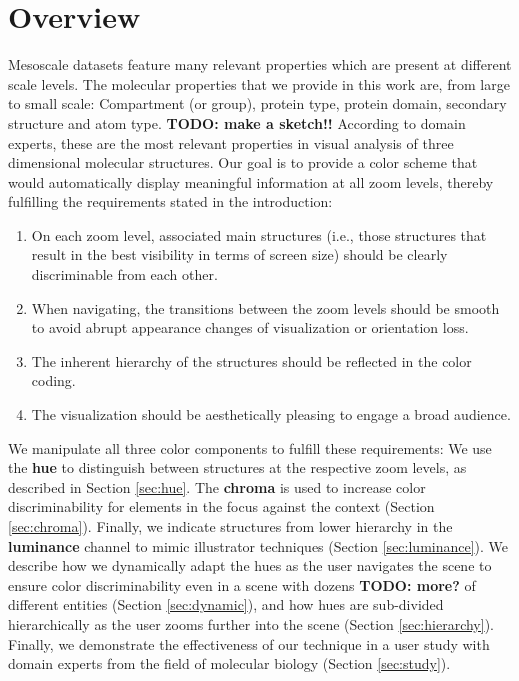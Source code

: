 \documentclass[review,journal]{vgtc}         %
\begin{document}
	\section{Overview}
	\label{Overview}

	
	Mesoscale datasets feature many relevant properties which are present at different scale levels.
	The molecular properties that we provide in this work are, from large to small scale: Compartment (or group), protein type, protein domain, secondary structure and atom type. \textbf{TODO: make a sketch!!}
	According to domain experts, these are the most relevant properties in visual analysis of three dimensional molecular structures.
	Our goal is to provide a color scheme that would automatically display meaningful information at all zoom levels, thereby fulfilling the requirements stated in the introduction: 
	

\begin{enumerate}
	\item On each zoom level, associated main structures (i.e., those structures that result in the best visibility in terms of screen size) should be clearly discriminable from each other. 
	\item When navigating, the transitions between the zoom levels should be smooth to avoid abrupt appearance changes of visualization or orientation loss. 
	\item The inherent hierarchy of the structures should be reflected in the color coding. 
	\item The visualization should be aesthetically pleasing to engage a broad audience. 
\end{enumerate}

We manipulate all three color components to fulfill these requirements: 
We use the \textbf{hue} to distinguish between structures at the respective zoom levels, as described in Section \ref{sec:hue}. 
The \textbf{chroma} is used to increase color discriminability for elements in the focus against the context (Section \ref{sec:chroma}). 
Finally, we indicate structures from lower hierarchy in the \textbf{luminance} channel to mimic illustrator techniques (Section \ref{sec:luminance}). 
We describe how we dynamically adapt the hues as the user navigates the scene to ensure color discriminability even in a scene with dozens \textbf{TODO: more?} of different entities (Section \ref{sec:dynamic}), and how hues are sub-divided hierarchically as the user zooms further into the scene (Section \ref{sec:hierarchy}). 
Finally, we demonstrate the effectiveness of our technique in a user study with domain experts from the field of molecular biology (Section \ref{sec:study}). 
\end{document}
